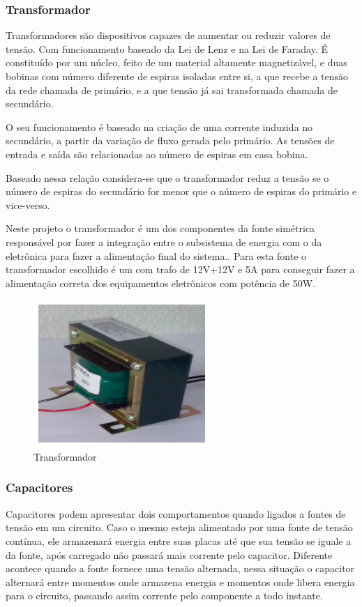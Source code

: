 \subsubsection{Transformador}
Transformadores são dispositivos capazes de aumentar ou reduzir valores de tensão. Com funcionamento baseado da Lei de Lenz e na Lei de Faraday. É constituído por um núcleo, feito de um material altamente magnetizável, e duas bobinas com número diferente de espiras isoladas entre si, a que recebe a tensão da rede chamada de primário, e a que tensão já sai transformada chamada de secundário.

O seu funcionamento é baseado na criação de uma corrente induzida no secundário, a partir da variação de fluxo gerada pelo primário. As tensões de entrada e saída são relacionadas ao número de espiras em casa bobina.

Baseado nessa relação considera-se que o transformador reduz a tensão se o número de espiras do secundário for menor que o número de espiras do primário e vice-verso.

Neste projeto o transformador é  um dos componentes da fonte simétrica responsável por fazer a integração entre o subsistema de energia com o da eletrônica para fazer a alimentação final do sistema.. Para esta fonte o transformador escolhido é um com trafo de 12V+12V e 5A para conseguir fazer a alimentação correta dos equipamentos eletrônicos com potência de 50W.

\begin{figure}[!h]
	\centering
		\includegraphics[scale=0.6]{figuras/energia/13.png}
	\caption{Transformador}
\end{figure}

\subsubsection{Capacitores}
Capacitores podem apresentar dois comportamentos quando ligados a fontes de tensão em um circuito. Caso o mesmo esteja alimentado por uma fonte de tensão contínua, ele armazenará energia entre suas placas até que sua tensão se iguale a da fonte, após carregado não passará mais corrente pelo capacitor. Diferente acontece quando a fonte fornece uma tensão alternada, nessa situação o capacitor alternará entre momentos onde armazena energia e momentos onde libera energia para o circuito, passando assim corrente pelo componente a todo instante.

